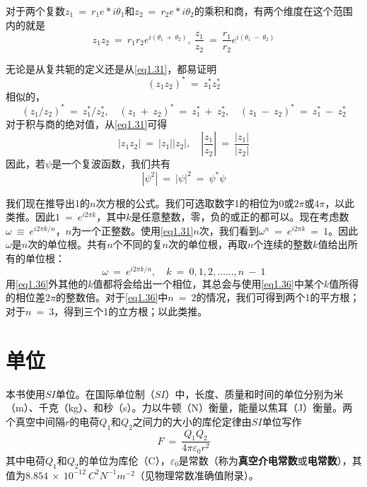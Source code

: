 \documentclass[12pt,a4paper,openany]{ctexbook}
\begin{document}
\begin{flushleft}
对于两个复数$z_1\ =\ r_1e*{i\theta_1}$和$z_2\ =\ r_2e*{i\theta_2}$的乘积和商，有两个维度在这个范围内的就是
\begin{equation}
    z_1z_2\ =\ r_1r_2e^{i(\theta_1\ +\ \theta_2)},\ \frac{z_1}{z_2}\ =\ \frac{r_1}{r_2}e^{i(\theta_1\ -\ \theta_2)}
    \label{eq1.31}
\end{equation}

无论是从复共轭的定义还是从\eqref{eq1.31}，都易证明
\begin{equation}
    \boxed{(z_1z_2)^*\ =\ z_1^*z_2^*}
\end{equation}
相似的，
\begin{equation}
    \boxed{(z_1/z_2)^*\ =\ z_1^*/z_2^*,\quad(z_1\ +\ z_2)^*\ =\ z_1^*\ +\ z_2^*,\quad(z_1\ -\ z_2)^*\ =\ z_1^*\ -\ z_2^*}
\end{equation}
对于积与商的绝对值，从\eqref{eq1.31}可得
\begin{equation}
    \left|z_1z_2\right|\ =\ \left|z_1\right|\left|z_2\right|,\quad\left|\frac{z_1}{z_2}\right|\ =\ \frac{\left|z_1\right|}{\left|z_2\right|} \label{eq1.34}
\end{equation}
因此，若$\psi$是一个复波函数，我们共有
\begin{equation}
    \left|\psi^2\right|\ =\ \left|\psi\right|^2\ =\ \psi^*\psi
\end{equation}

我们现在推导出1的$n$次方根的公式。我们可选取数字1的相位为$0$或$2\pi$或$4\pi$，以此类推。因此$1\ =\ e^{i2\pi k}$，其中$k$是任意整数，零，负的或正的都可以。现在考虑数$\omega\ \equiv\ e^{i2\pi k/n}$，$n$为一个正整数。使用\eqref{eq1.31}$n$次，我们看到$\omega^n\ =\ e^{i2\pi k}\ =\ 1$。因此$\omega$是$n$次的单位根。共有$n$个不同的复$n$次的单位根，再取$n$个连续的整数$k$值给出所有的单位根：
\begin{equation}
    \omega\ =\ e^{i2\pi k/n},\quad k\ =\ 0,1,2,……,n\ -\ 1
    \label{eq1.36}
\end{equation}
用\eqref{eq1.36}外其他的$k$值都将会给出一个相位，其总会与使用\eqref{eq1.36}中某个$k$值所得的相位差$2\pi$的整数倍。对于\eqref{eq1.36}中$n\ =\ 2$的情况，我们可得到两个1的平方根；对于$n\ =\ 3$，得到三个1的立方根；以此类推。
\end{flushleft}
\section{单位}
\begin{flushleft}
    \setlength{\parindent}{2em}
本书使用$SI$单位。在国际单位制（$SI$）中，长度、质量和时间的单位分别为米（m）、千克（kg）、和秒（s）。力以牛顿（N）衡量，能量以焦耳（J）衡量。两个真空中间隔$r$的电荷$Q_1$和$Q_2$之间力的大小的库伦定律由$SI$单位写作
\begin{equation}
    \boxed{F\ =\ \frac{Q_1Q_2}{4\pi \varepsilon_0r^2}} \label{eq1.37}
\end{equation}
其中电荷$Q_1$和$Q_2$的单位为库伦（C），$\varepsilon_0$是常数（称为\textbf{真空介电常数}或\textbf{电常数}），其值为$8.854\ \times\ 10^{-12}\ C^2N^{-1}m^{-2}$（见物理常数准确值附录）。
\end{flushleft}
\end{document}
